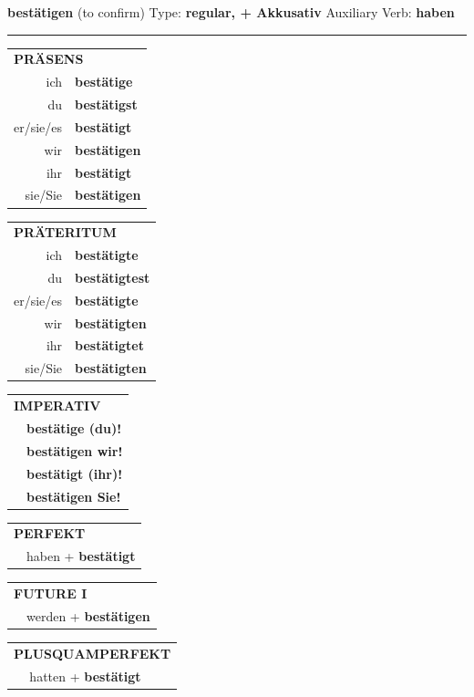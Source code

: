 \documentclass[10pt,a4paper]{revtex4-2}
\begin{document}
\begin{verbbox-acc}
{\Large \bf bestätigen} (to confirm) \hfill Type: \textbf{regular, + Akkusativ} \hfill Auxiliary Verb: \textbf{haben} 

\vspace{5pt}
\hrule
\vspace{5pt}

\begin{tabular}{rl}
\multicolumn{2}{l}{\textbf{PRÄSENS}}\\
ich & \textbf{bestätige}\\
du & \textbf{bestätigst}\\
er/sie/es & \textbf{bestätigt}\\
wir & \textbf{bestätigen}\\
ihr & \textbf{bestätigt}\\
sie/Sie & \textbf{bestätigen}\\
\end{tabular}
\hfill
\begin{tabular}{rl}
\multicolumn{2}{l}{\textbf{PRÄTERITUM}}\\
ich & \textbf{bestätigte}\\
du & \textbf{bestätigtest}\\
er/sie/es & \textbf{bestätigte}\\
wir & \textbf{bestätigten}\\
ihr & \textbf{bestätigtet}\\
sie/Sie & \textbf{bestätigten}\\
\end{tabular}
\hfill
\begin{tabular}{rl}
\multicolumn{2}{l}{\textbf{IMPERATIV}}\\
& \textbf{bestätige (du)!}\\
& \textbf{bestätigen wir!}\\
& \textbf{bestätigt (ihr)!}\\
& \textbf{bestätigen Sie!}\\
\end{tabular}

\vspace{10pt}

\begin{tabular}{rl}
\multicolumn{2}{l}{\textbf{PERFEKT}}\\
& haben + \textbf{bestätigt}\\
\end{tabular}
\hfill
\begin{tabular}{rl}
\multicolumn{2}{l}{\textbf{FUTURE I}}\\
& werden + \textbf{bestätigen}\\
\end{tabular}
\hfill
\begin{tabular}{rl}
\multicolumn{2}{l}{\textbf{PLUSQUAMPERFEKT}}\\
& hatten + \textbf{bestätigt}\\
\end{tabular}


\end{verbbox-acc}
\end{document}
